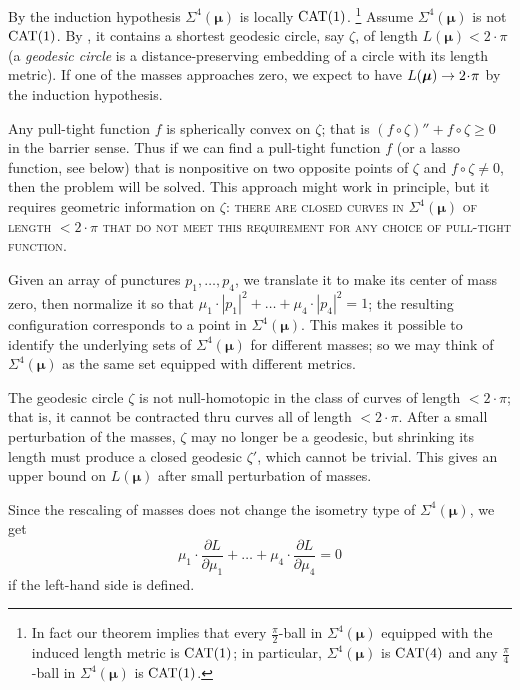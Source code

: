 \documentclass[a4paper,10pt]{article}
\begin{document}
By the induction hypothesis $\Sigma^4(\bm{\mu})$ is locally $\operatorname{\rm CAT}(1)$.%
\footnote{\label{foot:diagonal} In fact our theorem implies that every $\tfrac\pi2$-ball in $\Sigma^4(\bm{\mu})$ equipped with the induced length metric is $\operatorname{\rm CAT}(1)$;
in particular, $\Sigma^4(\bm{\mu})$ is $\operatorname{\rm CAT}(4)$ and any $\tfrac\pi4$-ball in $\Sigma^4(\bm{\mu})$ is $\operatorname{\rm CAT}(1)$.}
Assume $\Sigma^4(\bm{\mu})$ is not $\operatorname{\rm CAT}(1)$.
By \cite[II.4.17]{bridson-haefliger}, it contains a shortest geodesic circle, say $\zeta$, of length $L(\bm{\mu})<2\cdot\pi$ (a \emph{geodesic circle} is a distance-preserving embedding of a circle with its length metric).
If one of the masses approaches zero, we expect to have $L(\bm{\mu})\z\to2\cdot \pi$ by the induction hypothesis.

Any pull-tight function $f$ is spherically convex on $\zeta$;
that is $(f\circ \zeta)''+f\circ \zeta\ge 0$ in the barrier sense.
Thus if we can find a pull-tight function $f$ (or a lasso function, see below) that is nonpositive on two opposite points of $\zeta$ and $f\circ\zeta\ne0$, then the problem will be solved.
This approach might work in principle, but it requires geometric information on $\zeta$:
\textsc{there are closed curves in $\Sigma^4(\bm{\mu})$ of length $<2\cdot \pi$ that do not meet this requirement for any choice of pull-tight function}.

Given an array of punctures $p_1,\ldots, p_4$, we translate it to make its center of mass zero, then normalize it so that $\mu_1\cdot|p_1|^2+\ldots+ \mu_4\cdot|p_4|^2=1$;
the resulting configuration corresponds to a point in $\Sigma^4(\bm{\mu})$.
This makes it possible to identify the underlying sets of $\Sigma^4(\bm{\mu})$ for different masses; so we may think of $\Sigma^4(\bm{\mu})$ as the same set equipped with different metrics.

The geodesic circle $\zeta$ is not null-homotopic in the class of curves of length $<2\cdot\pi$;
that is, it cannot be contracted thru curves all of length $<2\cdot\pi$.
After a small perturbation of the masses, $\zeta$ may no longer be a geodesic,
but shrinking its length must produce a closed geodesic $\zeta'$, which cannot be trivial.
This gives an upper bound on $L(\bm{\mu})$ after small perturbation of masses.

Since the rescaling of masses does not change the isometry type of $\Sigma^4(\bm{\mu})$, we get
\[\mu_1\cdot \frac{\partial L}{\partial \mu_1}+\ldots+\mu_4\cdot \frac{\partial L}{\partial \mu_4}=0\] if the left-hand side is defined.
\end{document}
